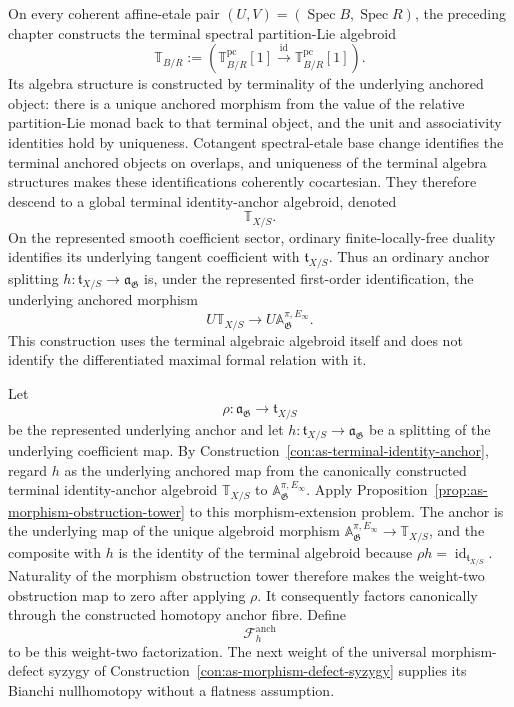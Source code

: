 \begin{construction}
\label{con:as-terminal-identity-anchor}
On every coherent affine-etale pair
$(U,V)=(\operatorname{Spec}B,\operatorname{Spec}R)$, the preceding chapter
constructs the terminal spectral partition-Lie algebroid
\[
\boxed{
    \mathbb T_{B/R}
    :=
    \left(
        \mathbb T_{B/R}^{\mathrm{pc}}[1]
        \xrightarrow{\operatorname{id}}
        \mathbb T_{B/R}^{\mathrm{pc}}[1]
    \right).
}
\]
Its algebra structure is constructed by terminality of the underlying
anchored object: there is a unique anchored morphism from the value of the
relative partition-Lie monad back to that terminal object, and the unit and
associativity identities hold by uniqueness.  Cotangent spectral-etale base
change identifies the terminal anchored objects on overlaps, and uniqueness
of the terminal algebra structures makes these identifications coherently
cocartesian.  They therefore descend to a global terminal identity-anchor
algebroid, denoted
\[
    \mathbb T_{X/S}.
\]
On the represented smooth coefficient sector, ordinary finite-locally-free
duality identifies its underlying tangent coefficient with
$\mathfrak t_{X/S}$.  Thus an ordinary anchor splitting
$h:\mathfrak t_{X/S}\to\mathfrak a_{\mathfrak G}$ is, under the represented
first-order identification, the underlying anchored morphism
\[
    U\mathbb T_{X/S}
    \longrightarrow
    U\mathbb A_{\mathfrak G}^{\pi,E_\infty}.
\]
This construction uses the terminal algebraic algebroid itself and does not
identify the differentiated maximal formal relation with it.
\end{construction}

\begin{construction}
\label{con:as-anchor-curvature}
Let
\[
    \rho:\mathfrak a_{\mathfrak G}\longrightarrow\mathfrak t_{X/S}
\]
be the represented underlying anchor and let
$h:\mathfrak t_{X/S}\to\mathfrak a_{\mathfrak G}$ be a splitting of the
underlying coefficient map.  By
Construction~\ref{con:as-terminal-identity-anchor}, regard $h$ as the
underlying anchored map from the canonically constructed terminal
identity-anchor algebroid $\mathbb T_{X/S}$ to
$\mathbb A_{\mathfrak G}^{\pi,E_\infty}$.  Apply
Proposition~\ref{prop:as-morphism-obstruction-tower} to this
morphism-extension problem.  The anchor is the underlying map of the unique
algebroid morphism
$\mathbb A_{\mathfrak G}^{\pi,E_\infty}\to\mathbb T_{X/S}$, and the composite
with $h$ is the identity of the terminal algebroid because
$\rho h=\operatorname{id}_{\mathfrak t_{X/S}}$.  Naturality of the morphism
obstruction tower therefore makes the weight-two obstruction map to zero
after applying $\rho$.  It consequently factors canonically through the
constructed homotopy anchor fibre.  Define
\[
\boxed{
    \mathcal F_h^{\mathrm{anch}}
}
\]
to be this weight-two factorization.  The next weight of the universal
morphism-defect syzygy of
Construction~\ref{con:as-morphism-defect-syzygy} supplies its Bianchi
nullhomotopy without a flatness assumption.
\end{construction}

